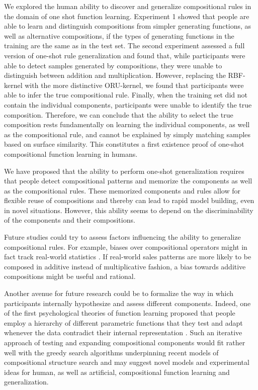 \documentclass[10pt,letterpaper]{article}
\begin{document}
We explored the human ability to discover and generalize compositional rules in the domain of one shot function learning. Experiment 1 showed that people are able to learn and distinguish compositions from simpler generating functions, as well as alternative compositions, if the types of generating functions in the training are the same as in the test set. The second experiment assessed a full version of one-shot rule generalization and found that, while participants were able to detect samples generated by compositions, they were unable to distinguish between addition and multiplication. However, replacing the RBF-kernel with the more distinctive ORU-kernel, we found that participants were able to infer the true compositional rule. Finally, when the training set did not contain the individual components, participants were unable to identify the true composition. Therefore, we can conclude that the ability to select the true composition rests fundamentally on learning the individual components, as well as the compositional rule, and cannot be explained by simply matching samples based on surface similarity. This constitutes a first existence proof of one-shot compositional function learning in humans.

We have proposed that the ability to perform one-shot generalization requires that people detect compositional patterns and memorize the components as well as the compositional rules. These memorized components and rules allow for flexible reuse of compositions and thereby can lead to rapid model building, even in novel situations. However, this ability seems to depend on the discriminability of the components and their compositions.

Future studies could try to assess factors influencing the ability to generalize compositional rules. For example, biases over compositional operators might in fact track real-world statistics \cite{griffiths2006optimal}. If real-world sales patterns are more likely to be composed in additive instead of  multiplicative fashion, a bias towards additive compositions might be useful and rational. 

Another avenue for future research could be to formalize the way in which participants internally hypothesize and assess different components. Indeed, one of the first psychological theories of function learning proposed that people employ a hierarchy of different parametric functions that they test and adapt whenever the data contradict their internal representation \cite{brehmer1974hypotheses}. Such an iterative approach of testing and expanding compositional components would fit rather well with the greedy search algorithms underpinning recent models of compositional structure search \cite{duvenaud2013structure} and may suggest novel models and experimental ideas for human, as well as artificial, compositional function learning and generalization.
\end{document}
